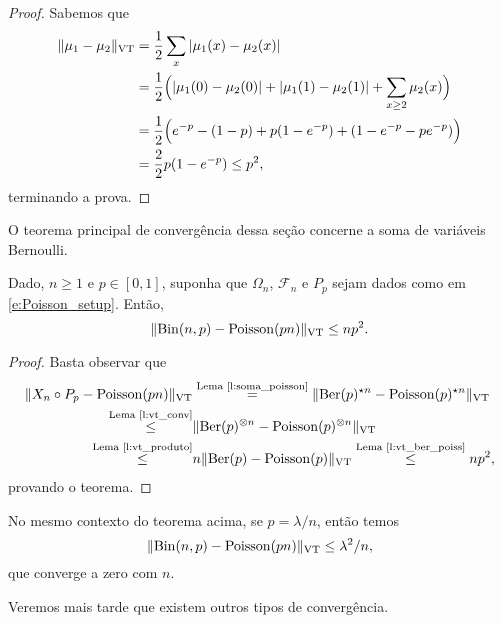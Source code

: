 \begin{topics}
\begin{proof}
Sabemos que
\begin{equation}
  \begin{split}
    \lVert \mu_1 - \mu_2 \rVert_{\operatorname{VT}} & = \frac{1}{2} \sum_{x} |\mu_1(x) - \mu_2(x)|\\
    & = \frac{1}{2} \Big( |\mu_1(0) - \mu_2(0)| + |\mu_1(1) - \mu_2(1)| + \sum_{x \geq 2} \mu_2(x) \Big)\\
    & = \frac{1}{2} \Big( e^{-p} - (1-p) + p(1-e^{-p}) + (1 - e^{-p} - p e^{-p}) \Big)\\
    & = \frac{2}{2} p (1 - e^{-p}) \leq p^2,
  \end{split}
\end{equation}
terminando a prova.
\end{proof}

O teorema principal de convergência dessa seção concerne a soma de variáveis Bernoulli.

\begin{theorem}
  \label{t:lei_peq_numeros}
  Dado, $n \geq 1$ e $p \in [0,1]$, suponha que $\Omega_n$, $\mathcal{F}_n$ e $P_p$ sejam dados como em \eqref{e:Poisson_setup}.
  Então,
  \begin{equation}
    \lVert \operatorname{Bin}(n,p) - \operatorname{Poisson}(pn) \rVert_{\operatorname{VT}} \leq n p^2.
  \end{equation}
\end{theorem}

\begin{proof}
  Basta observar que
  \begin{equation}
    \begin{split}
      \lVert X_n \circ P_p - \operatorname{Poisson}(pn) \rVert_{\operatorname{VT}} & \overset{\text{Lema~\ref{l:soma_poisson}}}= \lVert \operatorname{Ber}(p)^{\star n} - \operatorname{Poisson}(p)^{\star n} \rVert_{\operatorname{VT}}\\
      \overset{\text{Lema~\ref{l:vt_conv}}}\leq & \lVert \operatorname{Ber}(p)^{\otimes n} - \operatorname{Poisson}(p)^{\otimes n} \rVert_{\operatorname{VT}}\\
      \overset{\text{Lema~\ref{l:vt_produto}}}\leq & n \lVert \operatorname{Ber}(p) - \operatorname{Poisson}(p) \rVert_{\operatorname{VT}} \overset{\text{Lema~\ref{l:vt_ber_poiss}}}\leq n p^2,
    \end{split}
  \end{equation}
  provando o teorema.
\end{proof}

\begin{corollary}
  No mesmo contexto do teorema acima, se $p = \lambda/n$, então temos
  \begin{equation}
    \lVert \operatorname{Bin}(n,p) - \operatorname{Poisson}(pn) \rVert_{\operatorname{VT}} \leq \lambda^2 / n,
  \end{equation}
  que converge a zero com $n$.
\end{corollary}
Veremos mais tarde que existem outros tipos de convergência.



\end{topics}
